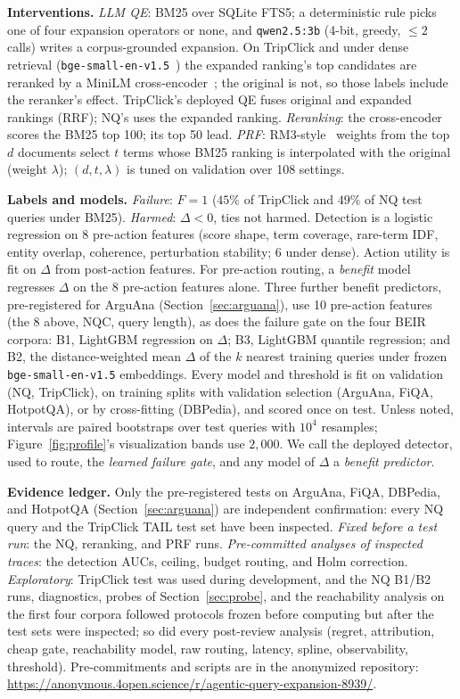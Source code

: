 \documentclass[sigconf,anonymous,review]{acmart}
\begin{document}
\textbf{Interventions.} \emph{LLM QE}: BM25 over SQLite FTS5; a
deterministic rule picks one of four expansion operators or none, and \texttt{qwen2.5:3b} (4-bit,
greedy, $\le2$ calls) writes a corpus-grounded expansion. On TripClick
and under dense retrieval (\texttt{bge-small-en-v1.5}~\cite{bge-embedding})
the expanded ranking's top candidates are reranked by a MiniLM
cross-encoder~\cite{minilm-cross-encoder}; the original is not, so
those labels include the reranker's effect. TripClick's deployed QE
fuses original and expanded rankings (RRF); NQ's uses the expanded
ranking. \emph{Reranking}: the cross-encoder scores the BM25 top 100;
its top 50 lead. \emph{PRF}: RM3-style~\cite{relevance-models}
weights from the top $d$ documents select $t$ terms whose BM25 ranking
is interpolated with the original (weight $\lambda$); $(d,t,\lambda)$
is tuned on validation over 108 settings.

\textbf{Labels and models.} \emph{Failure}: $F=1$ ($45\%$ of TripClick
and $49\%$ of NQ test queries under BM25). \emph{Harmed}: $\Delta<0$,
ties not harmed. Detection is a logistic regression on 8 pre-action
features (score shape, term coverage, rare-term IDF, entity overlap,
coherence, perturbation stability; 6 under dense). Action utility is
fit on $\Delta$ from post-action features. For
pre-action routing, a \emph{benefit} model regresses $\Delta$ on the 8
pre-action features alone. Three further benefit predictors,
pre-registered for ArguAna (Section~\ref{sec:arguana}), use 10
pre-action features (the 8 above, NQC, query length), as does the
failure gate on the four BEIR corpora: B1, LightGBM regression on $\Delta$;
B3, LightGBM quantile regression; and B2, the distance-weighted mean
$\Delta$ of the $k$ nearest training queries under frozen
\texttt{bge-small-en-v1.5} embeddings. Every model and threshold is fit on
validation (NQ, TripClick), on training splits with validation
selection (ArguAna, FiQA, HotpotQA), or by cross-fitting (DBPedia),
and scored once on test. Unless noted, intervals are paired bootstraps
over test queries with $10^4$ resamples; Figure~\ref{fig:profile}'s
visualization bands use $2{,}000$. We call the deployed detector,
used to route, the \emph{learned failure gate}, and any model of
$\Delta$ a \emph{benefit predictor}.

\textbf{Evidence ledger.} Only the pre-registered tests on ArguAna,
FiQA, DBPedia, and HotpotQA (Section~\ref{sec:arguana}) are independent
confirmation: every NQ
query and the TripClick TAIL test set have been inspected.
\emph{Fixed before a test run}: the NQ, reranking, and PRF runs.
\emph{Pre-committed analyses of inspected traces}: the detection AUCs, ceiling,
budget routing, and Holm correction. \emph{Exploratory}: TripClick test was used during
development, and the
NQ B1/B2 runs, diagnostics, probes of Section~\ref{sec:probe}, and the
reachability analysis on the first four corpora
followed protocols frozen before computing but after the test sets
were inspected; so did every post-review analysis (regret,
attribution, cheap gate, reachability model, raw routing, latency,
spline, observability, threshold).
Pre-commitments and scripts are in the anonymized repository:
\url{https://anonymous.4open.science/r/agentic-query-expansion-8939/}.
\end{document}
